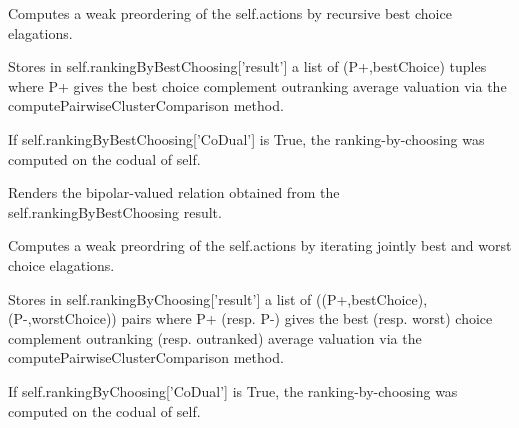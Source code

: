 \documentclass[letterpaper,10pt,english]{sphinxmanual}
\begin{document}
\begin{fulllineitems}

\begin{fulllineitems}
\label{techDoc:digraphs.Digraph.computeRankingByBestChoosing}
Computes a weak preordering of the self.actions by recursive
best choice elagations.

Stores in self.rankingByBestChoosing{[}'result'{]} a list of (P+,bestChoice) tuples
where P+ gives the best choice complement outranking
average valuation via the computePairwiseClusterComparison
method.

If self.rankingByBestChoosing{[}'CoDual'{]} is True, 
the ranking-by-choosing was computed on the codual of self.

\end{fulllineitems}


\begin{fulllineitems}
\label{techDoc:digraphs.Digraph.computeRankingByBestChoosingRelation}
Renders the bipolar-valued relation obtained from
the self.rankingByBestChoosing result.

\end{fulllineitems}


\begin{fulllineitems}
\label{techDoc:digraphs.Digraph.computeRankingByChoosing}
Computes a weak preordring of the self.actions by iterating
jointly best and worst choice elagations.

Stores in self.rankingByChoosing{[}'result'{]} a list of ((P+,bestChoice),(P-,worstChoice)) pairs
where P+ (resp. P-) gives the best (resp. worst) choice complement outranking
(resp. outranked) average valuation via the computePairwiseClusterComparison
method.

If self.rankingByChoosing{[}'CoDual'{]} is True, the ranking-by-choosing was computed on the codual of self.

\end{fulllineitems}


\end{fulllineitems}
\end{document}
